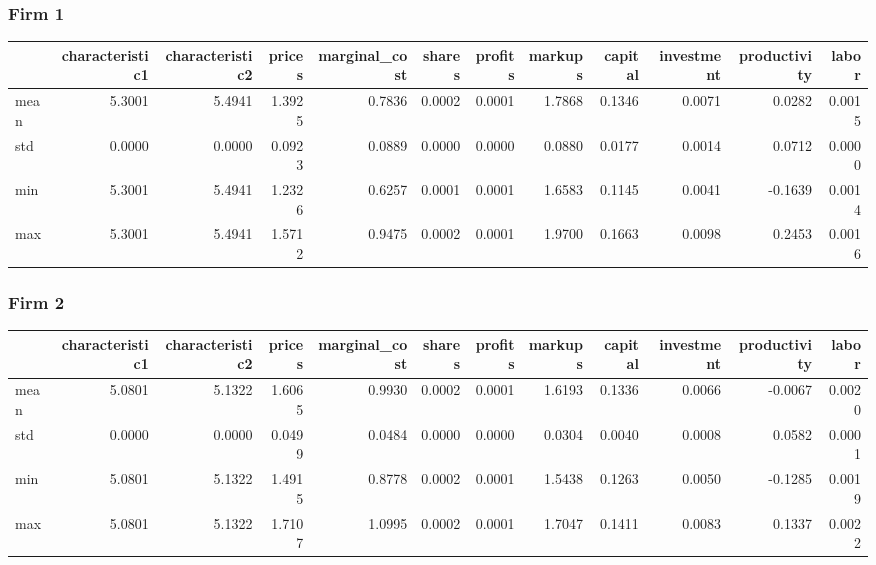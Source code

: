  \subsubsection*{Firm 1}
\begin{tabular}{lrrrrrrrrrrr}
\toprule
{} &  characteristic1 &  characteristic2 &  prices &  marginal\_cost &  shares &  profits &  markups &  capital &  investment &  productivity &  labor \\
\midrule
mean &           5.3001 &           5.4941 &  1.3925 &         0.7836 &  0.0002 &   0.0001 &   1.7868 &   0.1346 &      0.0071 &        0.0282 & 0.0015 \\
std  &           0.0000 &           0.0000 &  0.0923 &         0.0889 &  0.0000 &   0.0000 &   0.0880 &   0.0177 &      0.0014 &        0.0712 & 0.0000 \\
min  &           5.3001 &           5.4941 &  1.2326 &         0.6257 &  0.0001 &   0.0001 &   1.6583 &   0.1145 &      0.0041 &       -0.1639 & 0.0014 \\
max  &           5.3001 &           5.4941 &  1.5712 &         0.9475 &  0.0002 &   0.0001 &   1.9700 &   0.1663 &      0.0098 &        0.2453 & 0.0016 \\
\bottomrule
\end{tabular}


 \subsubsection*{Firm 2}
\begin{tabular}{lrrrrrrrrrrr}
\toprule
{} &  characteristic1 &  characteristic2 &  prices &  marginal\_cost &  shares &  profits &  markups &  capital &  investment &  productivity &  labor \\
\midrule
mean &           5.0801 &           5.1322 &  1.6065 &         0.9930 &  0.0002 &   0.0001 &   1.6193 &   0.1336 &      0.0066 &       -0.0067 & 0.0020 \\
std  &           0.0000 &           0.0000 &  0.0499 &         0.0484 &  0.0000 &   0.0000 &   0.0304 &   0.0040 &      0.0008 &        0.0582 & 0.0001 \\
min  &           5.0801 &           5.1322 &  1.4915 &         0.8778 &  0.0002 &   0.0001 &   1.5438 &   0.1263 &      0.0050 &       -0.1285 & 0.0019 \\
max  &           5.0801 &           5.1322 &  1.7107 &         1.0995 &  0.0002 &   0.0001 &   1.7047 &   0.1411 &      0.0083 &        0.1337 & 0.0022 \\
\bottomrule
\end{tabular}


